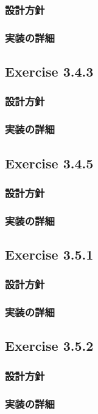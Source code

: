 \documentclass{jarticle}
\begin{document}
\subsubsection{設計方針}
\subsubsection{実装の詳細}

\subsection{Exercise 3.4.3}
\subsubsection{設計方針}
\subsubsection{実装の詳細}

\subsection{Exercise 3.4.5}
\subsubsection{設計方針}
\subsubsection{実装の詳細}

\subsection{Exercise 3.5.1}
\subsubsection{設計方針}
\subsubsection{実装の詳細}

\subsection{Exercise 3.5.2}
\subsubsection{設計方針}
\subsubsection{実装の詳細}
\end{document}
